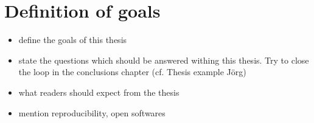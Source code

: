 \section{Definition of goals}

\begin{itemize}
\itemsep0em
  \item define the goals of this thesis
  \item state the questions which should be answered withing this thesis. Try to close the loop in the conclusions chapter (cf. Thesis example Jörg)
  \item what readers should expect from the thesis
  \item mention reproducibility, open softwares
\end{itemize}








